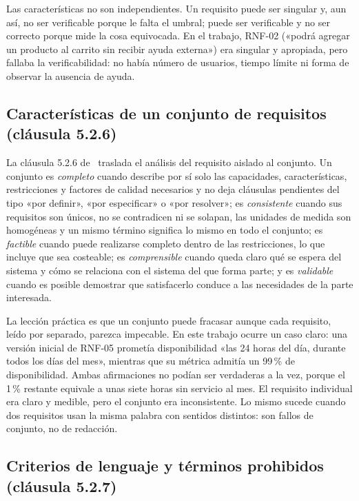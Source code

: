 \documentclass[11pt,a4paper]{article}
\begin{document}
Las características no son independientes. Un requisito puede ser singular
y, aun así, no ser verificable porque le falta el umbral; puede ser
verificable y no ser correcto porque mide la cosa equivocada. En el trabajo,
RNF-02 («podrá agregar un producto al carrito sin recibir ayuda externa»)
era singular y apropiada, pero fallaba la verificabilidad: no había número
de usuarios, tiempo límite ni forma de observar la ausencia de ayuda.

\subsection{Características de un conjunto de requisitos (cláusula 5.2.6)}
\label{sec:resumen-526}

La cláusula 5.2.6 de~\cite{iso29148} traslada el análisis del requisito
aislado al conjunto. Un conjunto es \emph{completo} cuando describe por sí
solo las capacidades, características, restricciones y factores de calidad
necesarios y no deja cláusulas pendientes del tipo «por definir», «por
especificar» o «por resolver»; es \emph{consistente} cuando sus requisitos
son únicos, no se contradicen ni se solapan, las unidades de medida son
homogéneas y un mismo término significa lo mismo en todo el conjunto; es
\emph{factible} cuando puede realizarse completo dentro de las
restricciones, lo que incluye que sea costeable; es \emph{comprensible}
cuando queda claro qué se espera del sistema y cómo se relaciona con el
sistema del que forma parte; y es \emph{validable} cuando es posible
demostrar que satisfacerlo conduce a las necesidades de la parte
interesada.

La lección práctica es que un conjunto puede fracasar aunque cada requisito,
leído por separado, parezca impecable. En este trabajo ocurre un caso claro:
una versión inicial de RNF-05 prometía disponibilidad «las 24 horas del día,
durante todos los días del mes», mientras que su métrica admitía un 99\,\%
de disponibilidad. Ambas afirmaciones no podían ser verdaderas a la vez,
porque el 1\,\% restante equivale a unas siete horas sin servicio al mes. El
requisito individual era claro y medible, pero el conjunto era
inconsistente. Lo mismo sucede cuando dos requisitos usan la misma palabra
con sentidos distintos: son fallos de conjunto, no de redacción.

\subsection{Criterios de lenguaje y términos prohibidos (cláusula 5.2.7)}
\label{sec:resumen-527}
\end{document}
